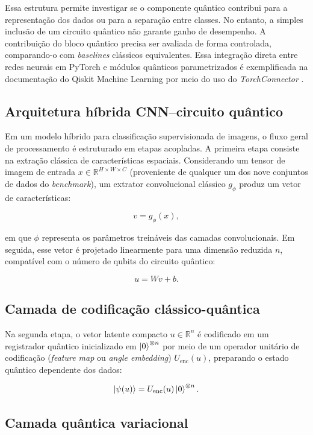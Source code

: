 \documentclass[
    12pt,
    openright,
    oneside,
    a4paper,
    english,
    brazil
]{abntex2}
\begin{document}
Essa estrutura permite investigar se o componente quântico contribui para a representação dos dados ou para a separação entre classes. No entanto, a simples inclusão de um circuito quântico não garante ganho de desempenho. A contribuição do bloco quântico precisa ser avaliada de forma controlada, comparando-o com \textit{baselines} clássicos equivalentes. Essa integração direta entre redes neurais em PyTorch e módulos quânticos parametrizados é exemplificada na documentação do Qiskit Machine Learning por meio do uso do \textit{TorchConnector} \cite{qiskitMachineLearningTorchConnector2026}.

\subsection{Arquitetura híbrida CNN--circuito quântico}

Em um modelo híbrido para classificação supervisionada de imagens, o fluxo geral de processamento é estruturado em etapas acopladas. A primeira etapa consiste na extração clássica de características espaciais. Considerando um tensor de imagem de entrada \(x \in \mathbb{R}^{H \times W \times C}\) (proveniente de qualquer um dos nove conjuntos de dados do \textit{benchmark}), um extrator convolucional clássico \(g_{\phi}\) produz um vetor de características:

\[
v = g_{\phi}(x),
\]

em que \(\phi\) representa os parâmetros treináveis das camadas convolucionais. Em seguida, esse vetor é projetado linearmente para uma dimensão reduzida \(n\), compatível com o número de qubits do circuito quântico:

\[
u = Wv + b.
\]

\subsection{Camada de codificação clássico-quântica}
\label{subsec:camada_codificacao_classico_quantica}

Na segunda etapa, o vetor latente compacto \(u \in \mathbb{R}^{n}\) é codificado em um registrador quântico inicializado em \(\ket{0}^{\otimes n}\) por meio de um operador unitário de codificação (\textit{feature map} ou \textit{angle embedding}) \(U_{\text{enc}}(u)\), preparando o estado quântico dependente dos dados:

\[
\ket{\psi(u)}
=
U_{\text{enc}}(u)
\ket{0}^{\otimes n}.
\]

\subsection{Camada quântica variacional}
\label{subsec:camada_quantica_variacional}
\end{document}
